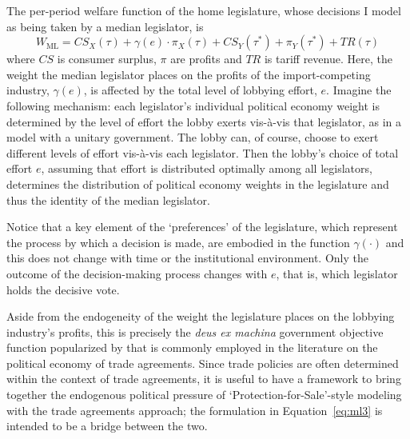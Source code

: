 \documentclass[authoryear, review]{elsarticle}
\newcommand{\ga}{\gamma}
\begin{document}

The per-period welfare function of the home legislature, whose decisions I model as being taken by a median legislator, is
\begin{equation}
  W_\text{ML} = \mathit{CS}_X(\tau) + \ga(e) \cdot \pi_X(\tau) + \mathit{CS}_Y(\tau^*) + \pi_Y(\tau^*) + \mathit{TR}(\tau)
  \label{eq:ml3}
\end{equation}
where $\mathit{CS}$ is consumer surplus, $\pi$ are profits and $\mathit{TR}$ is tariff revenue. Here, the weight the median legislator places on the profits of the import-competing industry, $\ga(e)$, is affected by the total level of lobbying effort, $e$. Imagine the following mechanism: each legislator's individual political economy weight is determined by the level of effort the lobby exerts vis-\`{a}-vis that legislator, as in a model with a unitary government. The lobby can, of course, choose to exert different levels of effort vis-\`{a}-vis each legislator. Then the lobby's choice of total effort $e$, assuming that effort is distributed optimally among all legislators, determines the distribution of political economy weights in the legislature and thus the identity of the median legislator.

Notice that a key element of the `preferences' of the legislature, which represent the process by which a decision is made, are embodied in the function $\ga(\cdot)$ and this does not change with time or the institutional environment. Only the outcome of the decision-making process changes with $e$, that is, which legislator holds the decisive vote.

Aside from the endogeneity of the weight the legislature places on the lobbying industry's profits, this is precisely the \textit{deus ex machina} government objective function popularized by \citet{baldwin} that is commonly employed in the literature on the political economy of trade agreements. Since trade policies are often determined within the context of trade agreements, it is useful to have a framework to bring together the endogenous political pressure of `Protection-for-Sale'-style modeling with the trade agreements approach; the formulation in Equation~\ref{eq:ml3} is intended to be a bridge between the two. 
\end{document}
